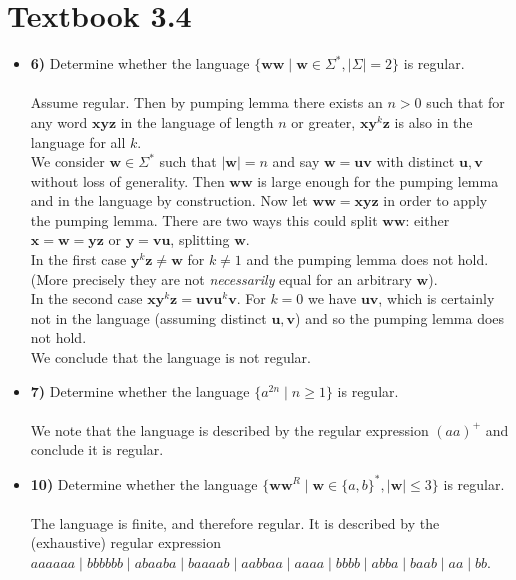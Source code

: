 \documentclass[defaultpackages]{simplereport}
\begin{document}
\section*{Textbook 3.4}
\begin{itemize}[label=]
  \item \textbf{6)} Determine whether the language $\{\mathbf{ww} \mid
    \mathbf{w} \in \Sigma^*, \lvert \Sigma \rvert = 2\}$ is regular.\\
    \\
    Assume regular. Then by pumping lemma there exists an $n > 0$ such that for
    any word $\mathbf{xyz}$ in the language of length $n$ or greater,
    $\mathbf{x}\mathbf{y}^k\mathbf{z}$ is also in the language for all $k$.\\
    We consider $\mathbf{w} \in \Sigma^*$ such that $\lvert \mathbf{w} \rvert =
    n$ and say $\mathbf{w} = \mathbf{uv}$ with distinct $\mathbf{u}, \mathbf{v}$
    without loss of generality. Then $\mathbf{ww}$ is large enough for the pumping lemma and in the
    language by construction. Now let $\mathbf{ww} = \mathbf{xyz}$ in order to
    apply the pumping lemma. There are two ways this could split $\mathbf{ww}$: either $\mathbf{x} = \mathbf{w} =
    \mathbf{yz}$ or $\mathbf{y} = \mathbf{vu}$, splitting $\mathbf{w}$.\\
    In the first case $\mathbf{y}^k\mathbf{z} \neq \mathbf{w}$ for $k \neq 1$
    and the pumping lemma does not hold. (More precisely they are not
    \textit{necessarily} equal for an arbitrary $\mathbf{w}$).\\
    In the second case $\mathbf{x}\mathbf{y}^k\mathbf{z} =
    \mathbf{u}\mathbf{vu}^k\mathbf{v}$. For $k = 0$ we have $\mathbf{uv}$, which
    is certainly not in the language (assuming distinct $\mathbf{u},
    \mathbf{v}$) and so the pumping lemma does not hold.\\
    We conclude that the language is not regular.
  \item \textbf{7)} Determine whether the language $\{a^{2n} \mid n \geq 1\}$ is
    regular.\\\\
    We note that the language is described by the regular expression $(aa)^+$
    and conclude it is regular.
  \item \textbf{10)} Determine whether the language $\{\mathbf{ww}^R \mid
    \mathbf{w} \in \{a, b\}^*, \lvert \mathbf{w} \rvert \leq 3\}$ is
    regular.\\\\
    The language is finite, and therefore regular. It is described by the
    (exhaustive) regular expression ${aaaaaa} \mid {bbbbbb} \mid
    {abaaba} \mid {baaaab} \mid {aabbaa} \mid {aaaa}
    \mid {bbbb} \mid {abba} \mid {baab} \mid {aa} \mid {bb}$.
\end{itemize}
\end{document}
